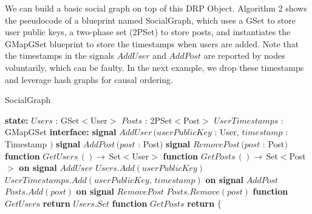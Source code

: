 \documentclass{article}
\begin{document}
We can build a basic social graph on top of this DRP Object. Algorithm 2 shows the pseudocode of a blueprint named SocialGraph, which uses a GSet to store user public keys, a two-phase set (2PSet) to store posts, and instantiates the GMapGSet blueprint to store the timestamps when users are added. Note that the timestamps in the signals $AddUser$ and $AddPost$ are reported by nodes voluntarily, which can be faulty. In the next example, we drop these timestamps and leverage hash graphs for causal ordering.

\begin{algorithm}
\caption{SocialGraph}
\begin{algorithmic}
\State \textbf{state:}
\State \hspace{\algorithmicindent} $Users$ : GSet$<$User$>$ 
\State \hspace{\algorithmicindent} $Posts$ : 2PSet$<$Post$>$ 
\State \hspace{\algorithmicindent} $UserTimestamps$ : GMapGSet 
\State
\State \textbf{interface:}
\State \hspace{\algorithmicindent} \textbf{signal} $AddUser\,(userPublicKey$ : User$,\,timestamp$ : Timestamp $)$
\State \hspace{\algorithmicindent} \textbf{signal} $AddPost\,(post$ : Post$)$
\State \hspace{\algorithmicindent} \textbf{signal} $RemovePost\,(post$ : Post$)$
\State \hspace{\algorithmicindent} \textbf{function} $GetUsers\,() \rightarrow\, $Set$<$User$>$
\State \hspace{\algorithmicindent} \textbf{function} $GetPosts\,() \rightarrow\, $Set$<$Post$>$
\State
\State \textbf{on signal} $AddUser$
\State \hspace{\algorithmicindent} $Users.Add(userPublicKey)$
\State \hspace{\algorithmicindent} $UserTimestamps.Add(userPublicKey,\,timestamp)$
\State
\State \textbf{on signal} $AddPost$
\State \hspace{\algorithmicindent} $Posts.Add(post)$
\State
\State \textbf{on signal} $RemovePost$
\State \hspace{\algorithmicindent} $Posts.Remove(post)$
\State
\State \textbf{function} $GetUsers$
\State \hspace{\algorithmicindent}\textbf{return} $Users.Set$
\State
\State \textbf{function} $GetPosts$
\State \hspace{\algorithmicindent}\textbf{return} $\{$

\end{algorithmic}
\end{algorithm}
\end{document}
